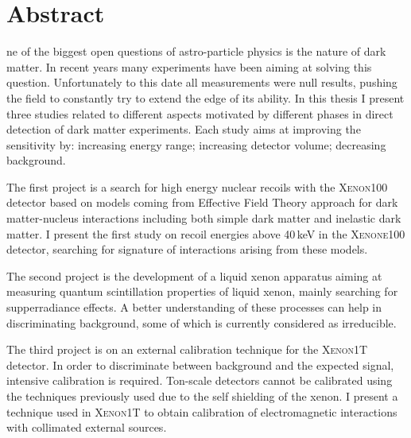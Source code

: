 %
%
%

\chapter*{Abstract}
\begin{SingleSpace}
ne of the biggest open questions of astro-particle physics is the nature of dark matter. In recent years many experiments have been aiming at solving this question. Unfortunately to this date all measurements were null results, pushing the field to constantly try to extend the edge of its ability.
In this thesis I present three studies related to different aspects motivated by  different phases in direct detection of dark matter experiments. Each study aims at improving the sensitivity by: increasing energy range; increasing detector volume; decreasing background.

The first project is a search for high energy nuclear recoils with the \textsc{Xenon100} detector based on models coming from Effective Field Theory approach for dark matter-nucleus interactions including both simple dark matter and inelastic dark matter. I present the first study on recoil energies above 40\,keV in the \textsc{Xenone100} detector, searching for signature of interactions arising from these models.

The second project is the development of a liquid xenon apparatus aiming at measuring quantum scintillation properties of liquid xenon, mainly searching for supperradiance effects. A better understanding of these processes can help in discriminating background, some of which is currently considered as irreducible.

The third project is on an external calibration technique for the \textsc{Xenon1T} detector. In order to discriminate between background and the expected signal, intensive calibration is required. Ton-scale detectors cannot be calibrated using the techniques previously used due to the self shielding of the xenon. I present a technique used in \textsc{Xenon1T} to obtain calibration of electromagnetic interactions with collimated external sources. 



\end{SingleSpace}
\clearpage